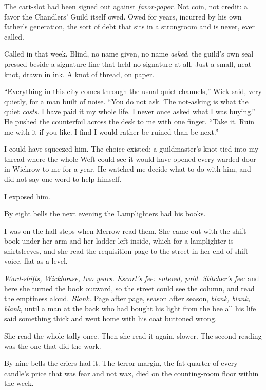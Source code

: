 The cart-slot had been signed out against \emph{favor-paper}. Not coin, not credit: a favor the Chandlers' Guild itself owed. Owed for years, incurred by his own father's generation, the sort of debt that sits in a strongroom and is never, ever called.

Called in that week. Blind, no name given, no name \emph{asked}, the guild's own seal pressed beside a signature line that held no signature at all. Just a small, neat knot, drawn in ink. A knot of thread, on paper.

``Everything in this city comes through the usual quiet channels,'' Wick said, very quietly, for a man built of noise. ``You do not ask. The not-asking is what the quiet \emph{costs}. I have paid it my whole life. I never once asked what I was buying.'' He pushed the counterfoil across the desk to me with one finger. ``Take it. Ruin me with it if you like. I find I would rather be ruined than be next.''

\scenebreak

I could have squeezed him. The choice existed: a guildmaster's knot tied into my thread where the whole Weft could see it would have opened every warded door in Wickrow to me for a year. He watched me decide what to do with him, and did not say one word to help himself.

I exposed him.

By eight bells the next evening the Lamplighters had his books.

I was on the hall steps when Merrow read them. She came out with the shift-book under her arm and her ladder left inside, which for a lamplighter is shirtsleeves, and she read the requisition page to the street in her end-of-shift voice, flat as a level.

\emph{Ward-shifts, Wickhouse, two years. Escort's fee: entered, paid.} \emph{Stitcher's fee:} and here she turned the book outward, so the street could see the column, and read the emptiness aloud. \emph{Blank.} Page after page, season after season, \emph{blank, blank, blank}, until a man at the back who had bought his light from the bee all his life said something thick and went home with his coat buttoned wrong.

She read the whole tally once. Then she read it again, slower. The second reading was the one that did the work.

By nine bells the criers had it. The terror margin, the fat quarter of every candle's price that was fear and not wax, died on the counting-room floor within the week.

